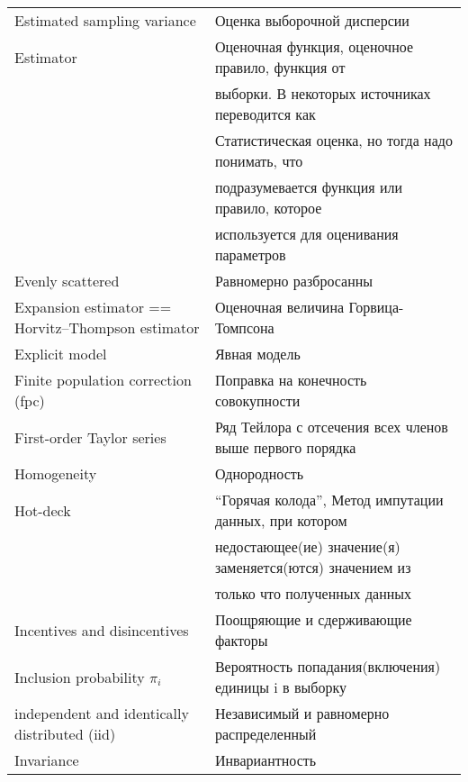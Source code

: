 \documentclass[12pt]{article}
\begin{document}
\begin{center}
\begin{tabular}{l|l}
Estimated sampling variance & Оценка выборочной дисперсии \\
Estimator & Оценочная функция, оценочное правило, функция от \\&выборки.  В некоторых источниках переводится как \\&Статистическая оценка, но тогда надо понимать, что\\& подразумевается функция или правило, которое \\& используется для оценивания параметров\\
Evenly scattered & Равномерно разбросанны\\
Expansion estimator == Horvitz–Thompson estimator & Оценочная величина Горвица-Томпсона\\
Explicit model & Явная модель\\
Finite population correction (fpc) & Поправка на конечность совокупности\\
First-order Taylor series & Ряд Тейлора с отсечения всех членов выше первого порядка\\
Homogeneity & Однородность\\
Hot-deck & ``Горячая колода'', Метод импутации данных, при котором \\ & недостающее(ие) значение(я) заменяется(ются) значением из \\ & только что полученных данных\\
Incentives and disincentives & Поощряющие и сдерживающие факторы\\
Inclusion probability $\pi_i$& Вероятность попадания(включения) единицы i в выборку \\
independent and identically distributed (iid) & Независимый и равномерно распределенный\\
Invariance & Инвариантность\\

\hline
\end{tabular}
\end{center}
\end{document}
